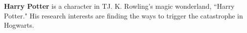 \begin{vita}%

{\bf Harry Potter} is a character in TJ. K. Rowling's magic wonderland, ``Harry Potter." His research interests are finding the ways to trigger the catastrophe in Hogwarts.

\end{vita}